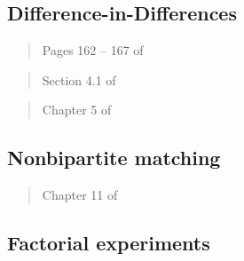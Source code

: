 \documentclass[12pt]{article}
\begin{document}
\begin{verse}  \end{verse}


\subsection{Difference-in-Differences}

\begin{verse} Pages 162 -- 167 of  \end{verse}

\begin{verse} Section 4.1 of  \end{verse}

\begin{verse} Chapter 5 of  \end{verse}

\begin{verse}  \end{verse}

\subsection{Nonbipartite matching}

\begin{verse} Chapter 11 of  \end{verse}

\begin{verse}  \end{verse}

\begin{verse}  \end{verse}

\subsection{Factorial experiments}

\begin{verse}  \end{verse}

\begin{verse}  \end{verse}
\end{document}
